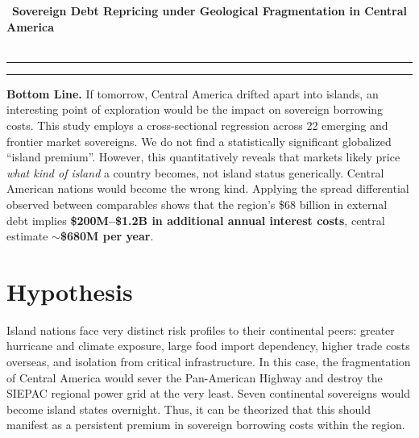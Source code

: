 \documentclass[11pt, a4paper]{article}
\begin{document}
\begin{center}
    {\ \textbf{Sovereign Debt Repricing under Geological Fragmentation in Central America}}\\[6pt]
    {\ }
\end{center}

\vspace{6pt}
\hrule
\vspace{2pt}
\hrule
\vspace{6pt}

\noindent\colorbox{gray!12}{\begin{minipage}{\dimexpr\textwidth-2\fboxsep}
\vspace{4pt}
\textbf{Bottom Line.} If tomorrow, Central America drifted apart into islands, an interesting point of exploration would be the impact on sovereign borrowing costs. This study employs a cross-sectional regression across 22 emerging and frontier market sovereigns. We do not find a statistically significant globalized ``island premium''. However, this quantitatively reveals that markets likely price \textit{what kind of island} a country becomes, not island status generically. Central American nations would become the wrong kind. Applying the spread differential observed between comparables shows that the region's \$68 billion in external debt implies \textbf{\$200M--\$1.2B in additional annual interest costs}, central estimate $\sim$\textbf{\$680M per year}.
\vspace{4pt}
\end{minipage}}

\section{Hypothesis}

Island nations face very distinct risk profiles to their continental peers: greater hurricane and climate exposure, large food import dependency, higher trade costs overseas, and isolation from critical infrastructure. In this case, the fragmentation of Central America would sever the Pan-American Highway and destroy the SIEPAC regional power grid at the very least. Seven continental sovereigns would become island states overnight. Thus, it can be  theorized that this should manifest as a persistent premium in sovereign borrowing costs within the region.
\end{document}
